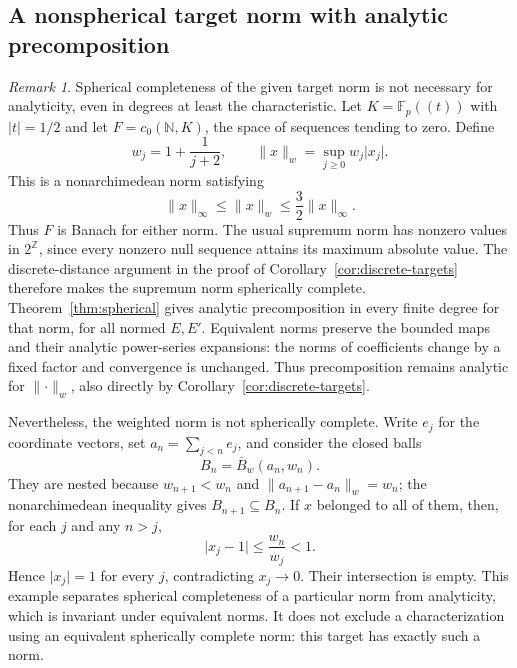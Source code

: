 \documentclass[11pt]{amsart}
\theoremstyle{definition}
\theoremstyle{remark}
\newtheorem{remark}[theorem]{Remark}
\numberwithin{equation}{section}
\newcommand{\N}{\mathbb N}
\newcommand{\Z}{\mathbb Z}
\newcommand{\F}{\mathbb F}
\newcommand{\abs}[1]{\lvert #1\rvert}
\newcommand{\norm}[1]{\lVert #1\rVert}
\begin{document}
\subsection{A nonspherical target norm with analytic precomposition}
\begin{remark}\label{rem:nonspherical-analytic-target}
Spherical completeness of the given target norm is not necessary for analyticity, even in degrees
at least the characteristic. Let $K=\F_p((t))$ with $\abs t=1/2$ and let $F=c_0(\N,K)$, the space
of sequences tending to zero. Define
\[
 w_j=1+\frac1{j+2},\qquad \norm{x}_w=\sup_{j\ge0}w_j\abs{x_j}.
\]
This is a nonarchimedean norm satisfying
\[
 \norm{x}_\infty\le\norm{x}_w\le\frac32\norm{x}_\infty.
\]
Thus $F$ is Banach for either norm. The usual supremum norm has nonzero values in $2^\Z$,
since every nonzero null sequence attains its maximum absolute value. The discrete-distance
argument in the proof of Corollary~\ref{cor:discrete-targets} therefore makes the supremum norm
spherically complete. Theorem~\ref{thm:spherical} gives analytic precomposition in every finite
degree for that norm, for all normed $E,E'$. Equivalent norms preserve the bounded maps and their
analytic power-series expansions: the norms of coefficients change by a fixed factor and convergence
is unchanged. Thus precomposition remains analytic for $\norm\cdot_w$, also directly by
Corollary~\ref{cor:discrete-targets}.

Nevertheless, the weighted norm is not spherically complete. Write $e_j$ for the coordinate vectors,
set $a_n=\sum_{j<n}e_j$, and consider the closed balls
\[
 B_n=\overline B_w(a_n,w_n).
\]
They are nested because $w_{n+1}<w_n$ and $\norm{a_{n+1}-a_n}_w=w_n$; the nonarchimedean
inequality gives $B_{n+1}\subseteq B_n$. If $x$ belonged to all of them, then, for each $j$ and
any $n>j$,
\[
 \abs{x_j-1}\le\frac{w_n}{w_j}<1.
\]
Hence $\abs{x_j}=1$ for every $j$, contradicting $x_j\to0$. Their intersection is empty.
This example separates spherical completeness of a particular norm from analyticity, which is
invariant under equivalent norms. It does not exclude a characterization using an equivalent
spherically complete norm: this target has exactly such a norm.
\end{remark}
\end{document}
